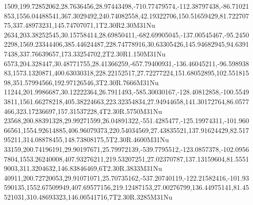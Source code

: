 1509,199.72852062,28.7636456,28.97443498,-710.77479574,-112.38797438,-86.71021853,1556.04488541,367.3029492,240.74082558,42.19322706,150.51659429,81.72270775,337.48973231,145.74707071,1T2.30R2.30M31Nu
2634,203.38252545,30.15758414,28.69850411,-682.69905045,-137.00545467,-95.24502298,1569.23344406,385.44624487,228.74778916,30.63305426,145.94682945,94.63917438,337.76639657,173.33254702,2T2.30R1.150M31Nu
6573,204.328447,30.48771755,28.41366259,-657.79400931,-136.46045211,-96.59893883,1573.1320871,400.63030318,228.22152517,27.72277224,151.68052895,102.55181598,351.57994566,192.97126546,3T2.30R.7666M31Nu
11244,201.9986687,30.12222364,26.7911493,-585.30030167,-128.40812858,-100.55493811,1561.66278218,405.38224663,223.32354834,27.94944658,141.30172764,86.0577466,323.17236697,157.31537228,4T2.30R.5750M31Nu
23568,200.88391328,29.99271599,26.04891322,-551.4285477,-125.19974311,-101.96066561,1554.92614885,406.96079373,220.54034569,27.43835521,137.91624429,82.51795211,314.08878455,148.73808175,5T2.30R.4600M31Nu
33159,200.74196191,29.90197671,25.79972139,-539.7795512,-123.0857378,-102.09567804,1553.26240008,407.93276211,219.53207251,27.02370787,137.13159604,81.55519003,311.3204632,146.83846469,6T2.30R.3833M31Nu
40911,200.72720053,29.91071071,25.70735162,-537.20740119,-122.21582416,-101.93590135,1552.67509949,407.69577156,219.12487153,27.00276799,136.44975141,81.45521031,310.48693323,146.00541716,7T2.30R.3285M31Nu
